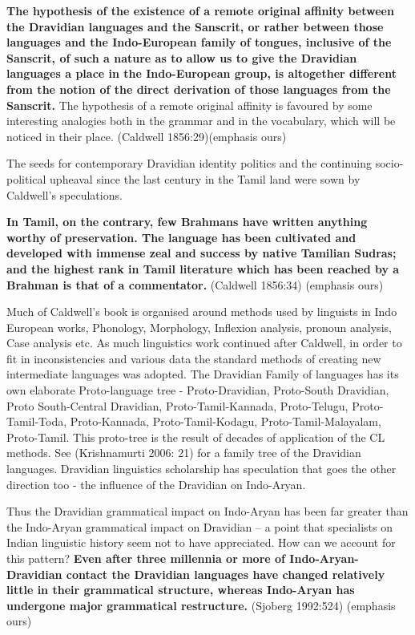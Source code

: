 \begin{myquote}
\textbf{The hypothesis of the existence of a remote original affinity between the Dravidian languages and the Sanscrit, or rather between those languages and the Indo-European family of tongues, inclusive of the Sanscrit, of such a nature as to allow us to give the Dravidian languages a place in the Indo-European group, is altogether different from the notion of the direct derivation of those languages from the Sanscrit.} The hypothesis of a remote original affinity is favoured by some interesting analogies both in the grammar and in the vocabulary, which will be noticed in their place. (Caldwell 1856:29)(emphasis ours)
\end{myquote}

The seeds for contemporary Dravidian identity politics and the continuing socio-political upheaval since the last century in the Tamil land were sown by Caldwell’s speculations.

\begin{myquote}
\textbf{In Tamil, on the contrary, few Brahmans have written anything worthy of preservation. The language has been cultivated and developed with immense zeal and success by native Tamilian Sudras; and the highest rank in Tamil literature which has been reached by a Brahman is that of a commentator.} (Caldwell 1856:34) (emphasis ours)
\end{myquote}

Much of Caldwell’s book is organised around methods used by linguists in Indo European works, Phonology, Morphology, Inflexion analysis, pronoun analysis, Case analysis etc. As much linguistics work continued after Caldwell, in order to fit in inconsistencies and various data the standard methods of creating new intermediate languages was adopted. The Dravidian Family of languages has its own elaborate Proto-language tree - Proto-Dravidian, Proto-South Dravidian, Proto South-Central Dravidian, Proto-Tamil-Kannada, Proto-Telugu, Proto-Tamil-Toda, Proto-Kannada, Proto-Tamil-Kodagu, Proto-Tamil-Malayalam, Proto-Tamil. This proto-tree is the result of decades of application of the CL methods. See (Krishnamurti 2006: 21) for a family tree of the Dravidian languages. Dravidian linguistics scholarship has speculation that goes the other direction too - the influence of the Dravidian on Indo-Aryan.

\begin{myquote}
Thus the Dravidian grammatical impact on Indo-Aryan has been far greater than the Indo-Aryan grammatical impact on Dravidian – a point that specialists on Indian linguistic history seem not to have appreciated. How can we account for this pattern? \textbf{Even after three millennia or more of Indo-Aryan-Dravidian contact the Dravidian languages have changed relatively little in their grammatical structure, whereas Indo-Aryan has undergone major grammatical restructure.} (Sjoberg 1992:524) (emphasis ours)
\end{myquote}


